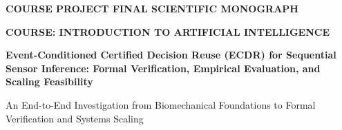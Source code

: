 \documentclass[journal,onecolumn,10pt]{IEEEtran}
\theoremstyle{remark}
\begin{document}
\hypersetup{pageanchor=false}

\begin{titlepage}
\vspace*{0.4cm}
{\Large\bfseries\color{teal} COURSE PROJECT FINAL SCIENTIFIC MONOGRAPH\par}
\vspace{0.2cm}
{\large\bfseries\color{ink} COURSE: INTRODUCTION TO ARTIFICIAL INTELLIGENCE\par}
\vspace{0.35cm}
{\huge\bfseries\color{ink} Event-Conditioned Certified Decision Reuse (ECDR) for Sequential Sensor Inference: Formal Verification, Empirical Evaluation, and Scaling Feasibility\par}
\vspace{0.45cm}
{\large\color{ink} An End-to-End Investigation from Biomechanical Foundations to Formal Verification and Systems Scaling\par}
\vspace{0.6cm}


\end{titlepage}
\end{document}
